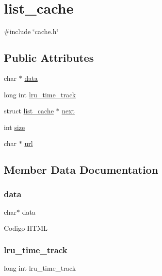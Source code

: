 \hypertarget{structlist__cache}{}\section{list\+\_\+cache}
\label{structlist__cache}


{\ttfamily \#include \char`\"{}cache.\+h\char`\"{}}

\subsection*{Public Attributes}
\begin{DoxyCompactItemize}
\item 
char $\ast$ \hyperlink{structlist__cache_a91a70b77df95bd8b0830b49a094c2acb}{data}
\item 
long int \hyperlink{structlist__cache_a8d8530e28845a0fef3e9d9298c008b43}{lru\+\_\+time\+\_\+track}
\item 
struct \hyperlink{structlist__cache}{list\+\_\+cache} $\ast$ \hyperlink{structlist__cache_aceefb1f57729a8a9a02a627d55effcc7}{next}
\item 
int \hyperlink{structlist__cache_a439227feff9d7f55384e8780cfc2eb82}{size}
\item 
char $\ast$ \hyperlink{structlist__cache_ab135e5154c1828bef226a3df98ee3333}{url}
\end{DoxyCompactItemize}


\subsection{Member Data Documentation}
\mbox{\label{structlist__cache_a91a70b77df95bd8b0830b49a094c2acb}} 
\subsubsection{\texorpdfstring{data}{data}}
{\footnotesize\ttfamily char$\ast$ data}

Codigo H\+T\+ML \mbox{\label{structlist__cache_a8d8530e28845a0fef3e9d9298c008b43}} 
\subsubsection{\texorpdfstring{lru\+\_\+time\+\_\+track}{lru\_time\_track}}
{\footnotesize\ttfamily long int lru\+\_\+time\+\_\+track}

